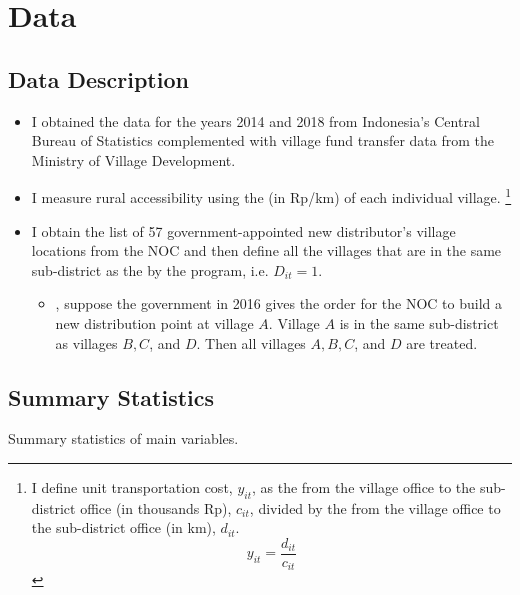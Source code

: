 \documentclass[
11pt,notheorems,compress,hyperref={pdfauthor=Maghfira Ramadhani}
]{beamer}
\begin{document}
\section{Data}
\subsection{Data Description}
\begin{frame}
    \begin{itemize}
        \item I obtained the  data for the years 2014 and 2018 from Indonesia's Central Bureau of Statistics complemented with village fund transfer data from the Ministry of Village Development.
        \item I measure rural accessibility using the  (in Rp/km) of each individual village. 
        \footnote{I define unit transportation cost, $y_{it}$, as the  from the village office to the sub-district office (in thousands Rp), $c_{it}$, divided by the  from the village office to the sub-district office (in km), $d_{it}$.
        \begin{equation}
        y_{it}=\frac{d_{it}}{c_{it}}    
        \end{equation}}
        \item I obtain the list of 57 government-appointed new distributor's village locations from the NOC and then define all the villages that are in the same sub-district as the  by the program, i.e. $D_{it}=1$. 
        \begin{itemize}
            \item {}, suppose the government in 2016 gives the order for the NOC to build a new distribution point at village $A$. Village $A$ is in the same sub-district as villages $B,C$, and $D$. Then all villages $A,B,C$, and $D$ are treated.
        \end{itemize}
    \end{itemize}
\end{frame}

\subsection{Summary Statistics}
\begin{frame}
    \begin{table}[h]
    \caption{Summary statistics of main variables. }
    \scalebox{0.75}{}
    \label{t1}\end{table}
\end{frame}
\end{document}
